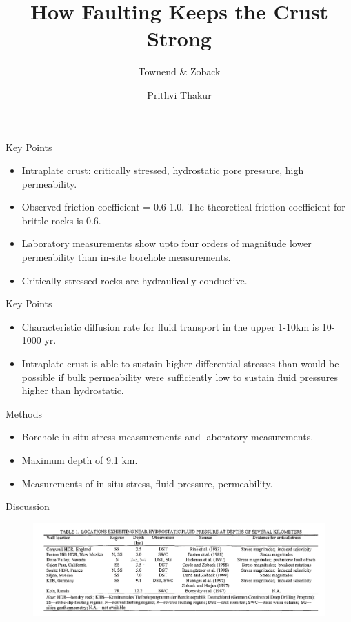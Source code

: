 \documentclass[12pt]{beamer}
\title{How Faulting Keeps the Crust Strong}
\subtitle{Townend \& Zoback}
\date{}
\author{Prithvi Thakur}
\institute{Paper discussion}
\begin{document}
\maketitle

\begin{frame}[fragile]{Key Points}
    \begin{itemize}
        \item Intraplate crust: critically stressed, hydrostatic pore pressure, high permeability.
        \item Observed friction coefficient = 0.6-1.0. The theoretical friction coefficient for brittle rocks is 0.6.
        \item Laboratory measurements show upto four orders of magnitude lower permeability than in-site borehole measurements.
        \item Critically stressed rocks are hydraulically conductive.
    \end{itemize}
\end{frame}

\begin{frame}[fragile]{Key Points}
    \begin{itemize}
        \item Characteristic diffusion rate for fluid transport in the upper 1-10km is 10-1000 yr. 
        \item Intraplate crust is able to sustain higher differential stresses than would be possible if bulk permeability were sufficiently low to sustain fluid pressures higher than hydrostatic.
    \end{itemize}
\end{frame}

\begin{frame}[fragile]{Methods}
    \begin{itemize}
        \item Borehole in-situ stress meassurements and laboratory measurements.
        \item Maximum depth of 9.1 km.
        \item Measurements of in-situ stress, fluid pressure, permeability.
    \end{itemize}
\end{frame}

\begin{frame}[fragile]{Discussion}
    \begin{figure}
        \includegraphics[width=1\linewidth]{images/5}
    \end{figure}
\end{frame}
\end{document}
